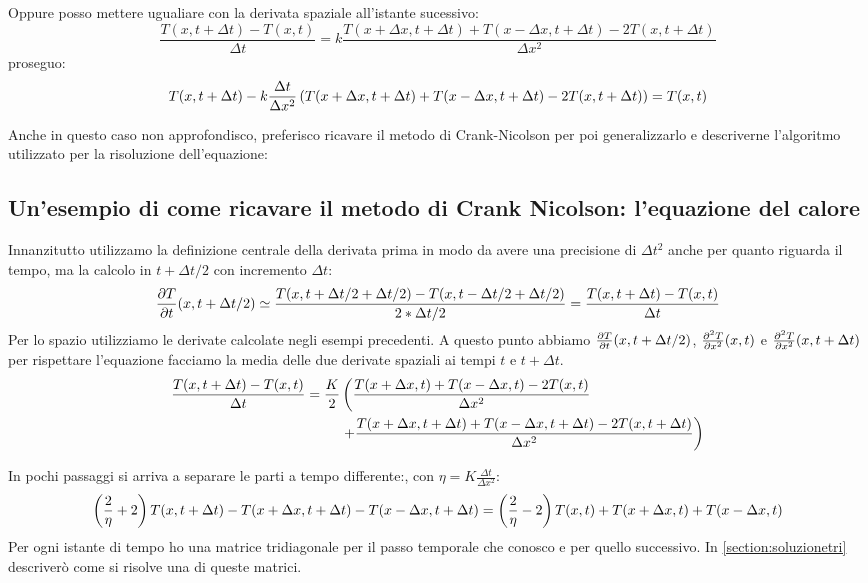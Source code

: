 Oppure posso mettere ugualiare con la derivata spaziale all'istante sucessivo:
\begin{equation}
\frac{T(x,t+\Delta t)-T(x,t)}{\Delta t} = k \frac{T(x+\Delta x,t+\Delta t)+T(x-\Delta x,t+\Delta t)-2T(x,t+\Delta t)}{\Delta x^2}
\end{equation}
proseguo:
\begin{equation}
T(x,t+\Delta t)- k \frac{\Delta t}{\Delta x^2}\lrt{T(x+\Delta x,t+\Delta t)+T(x-\Delta x,t+\Delta t)-2T(x,t+\Delta t)} = T(x,t)
\end{equation}

Anche in questo caso non approfondisco, preferisco ricavare il metodo di Crank-Nicolson per poi generalizzarlo e descriverne l'algoritmo utilizzato per la risoluzione dell'equazione:

\subsection{Un'esempio di come ricavare il metodo di Crank Nicolson: l'equazione del calore}
Innanzitutto utilizzamo la definizione centrale della derivata prima in modo da avere una precisione di $\Delta t^2$ anche per quanto riguarda il tempo, ma la calcolo in $t+\Delta t/2$ con incremento $\Delta t$:
\begin{equation}
\pde{T}t(x,t+\Delta t/2) \simeq \frac{T(x,t+\Delta t/2+\Delta t/2)-T(x,t-\Delta t/2+\Delta t/2)}{2*\Delta t/2} = \frac{T(x,t+\Delta t)-T(x,t)}{\Delta t}
\end{equation}
Per lo spazio utilizziamo le derivate calcolate negli esempi precedenti.
A questo punto abbiamo $\pde{T}t(x,t+\Delta t/2)$, $\pde{^2T}{x^2}(x,t)$ e $\pde{^2T}{x^2}(x,t+\Delta t)$ per rispettare l'equazione facciamo la media delle due derivate spaziali ai tempi $t$ e $t+\Delta t$.
\begin{equation}\label{eq:HeatForCrank}
\begin{aligned}
\frac{T(x,t+\Delta t)-T(x,t)}{\Delta t} = \frac K2 &\lr(.{\frac{T(x+\Delta x,t)+T(x-\Delta x,t)-2T(x,t)}{\Delta x^2}}\\
&\lr.){+\frac{T(x+\Delta x,t+\Delta t)+T(x-\Delta x,t+\Delta t)-2T(x,t+\Delta t)}{\Delta x^2}}
\end{aligned}
\end{equation}

In pochi passaggi si arriva a separare le parti a tempo differente:, con $\eta = K\frac{\Delta t}{\Delta x^2}$:
\begin{equation}
\lrt{\frac 2\eta +2}T(x,t+\Delta t) -T(x+\Delta x,t+\Delta t)-T(x-\Delta x,t+\Delta t) = \lrt{\frac 2\eta -2}T(x,t)+T(x+\Delta x,t)+T(x-\Delta x,t)
\end{equation}
Per ogni istante di tempo ho una matrice tridiagonale per il passo temporale che conosco e per quello successivo. In \autoref{section:soluzionetri} descriver\`o come si risolve una di queste matrici.